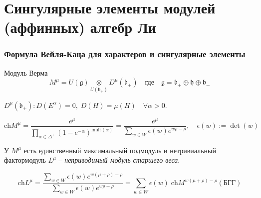 \documentclass[pdftex]{beamer}
\newcommand{\gf}{\mathfrak{g}}
\newcommand{\bff}{\mathfrak{b}}
\newcommand{\hf}{\mathfrak{h}}
\theoremstyle{definition} \newtheorem{Def}{Определение}
\begin{document}
\section{Сингулярные элементы модулей (аффинных) алгебр Ли}

\begin{frame}
  \frametitle{Формула Вейля-Каца для характеров и сингулярные элементы}

Модуль Верма 
\begin{equation*}
 M^{\mu}=U(\gf)\underset{U(\bff_{+})}{\otimes} D^{\mu}(\bff_{+}) \quad \mbox{где} \quad     \gf=\bff_{+}\oplus \hf \oplus\bff_{-}
\end{equation*}

$D^{\mu}(\bff_{+}): D(E^{\alpha})=0,\; D(H)=\mu(H)\quad \forall \alpha>0$.

\begin{equation*}
  \label{eq:11}
  \mathrm{ch} M^{\mu}=\frac{e^{\mu}}{\prod_{\alpha\in \Delta^{+}} \left( 1-e^{-\alpha}\right)^{\mathrm{mult}(\alpha)}}=\frac{e^{\mu}}{\sum_{w\in W} \epsilon(w) e^{w\rho-\rho}}, \quad \epsilon \left( w\right) :=\det \left( w\right)
\end{equation*}
  
У $M^{\mu}$ есть единственный максимальный подмодуль и нетривиальный фактормодуль $L^{\mu}$ -- 
{\it неприводимый модуль старшего веса}. 

\begin{equation*}
  \label{eq:13}
  \mathrm{ch} L^{\mu}=\frac{\sum_{w\in W} \epsilon(w) e^{w(\mu+\rho)-\rho}}{\sum_{w\in W}\epsilon(w) e^{w\rho-\rho}}=\sum_{w\in W} \epsilon(w)\; \mathrm{ch} M^{w(\mu+\rho)-\rho} (\mbox{БГГ})
\end{equation*}

\end{frame}
\end{document}
